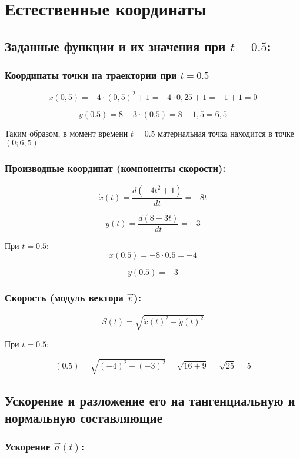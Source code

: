 \section{Естественные координаты}

\subsection{Заданные функции и их значения при  $t=0.5$:}
\subsubsection{Координаты точки на траектории при $t = 0.5$}

\[
    x(0, 5) = -4  \cdot (0, 5)^{ 2} + 1 = -4 \cdot 0,25 + 1 = -1 + 1 = 0
\]

\[
    y(0.5)=8−3 \cdot (0.5)=8 − 1,5= 6,5
\]

Таким образом, в момент времени 
$t=0.5$ материальная точка находится в точке 
$(0;6,5)$

\subsubsection{Производные координат (компоненты скорости):}

\[
    {\dot x}(t) = \frac{ d (-4t^{ 2}+1)}{ d t} = -8t
\]

\[
    {\dot y(t)} =   \frac{ d (8-3t)}{ d t} = -3
\]

При $t=0.5$:
\[
 {\dot x}(0.5) = -8 \cdot 0.5 = -4
 \]


 \[
    {\dot y}(0.5) = -3
 \]



\subsubsection{Скорость (модуль вектора $\vec{v}$):}

\[
 S(t) = \sqrt{{\dot x}(t)^{ 2} + {\dot y}(t)^{ 2}}
\]

При $t=0.5$:

\[
 (0.5) = \sqrt{(-4)^{ 2} + (-3)^{ 2}} = \sqrt{16 + 9} = \sqrt{25} = 5
\]

\subsection{Ускорение и разложение его на тангенциальную и нормальную составляющие}

\subsubsection{Ускорение $\vec{a}(t)$:}

